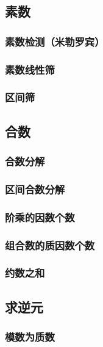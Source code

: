 \documentclass{article}
\begin{document}
\subsection{素数}
\subsubsection{素数检测（米勒罗宾）}

\subsubsection{素数线性筛}

\subsubsection{区间筛}


\subsection{合数}
\subsubsection{合数分解}

\subsubsection{区间合数分解}

\subsubsection{阶乘的因数个数}

\subsubsection{组合数的质因数个数}

\subsubsection{约数之和}


\subsection{求逆元}
\subsubsection{模数为质数}

\end{document}
